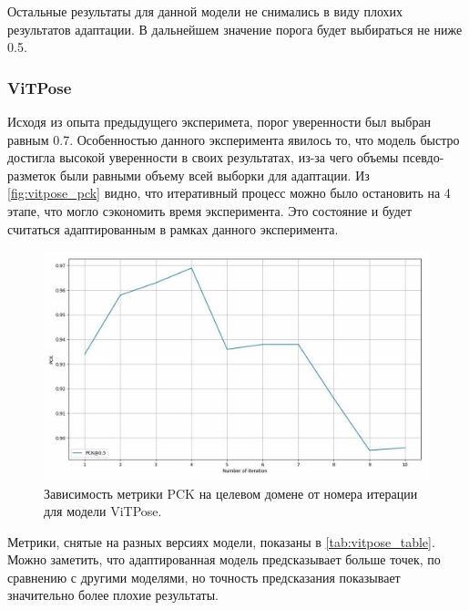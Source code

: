 Остальные результаты для данной модели не снимались в виду плохих результатов адаптации. В дальнейшем значение порога будет выбираться не ниже 0.5.

\subsubsection*{ViTPose}

Исходя из опыта предыдущего эксперимета, порог уверенности был выбран равным 0.7. Особенностью данного эксперимента явилось то, что модель быстро достигла высокой уверенности в своих результатах, из-за чего объемы псевдо-разметок были равными объему всей выборки для адаптации. Из \autoref{fig:vitpose_pck} видно, что итеративный процесс можно было остановить на 4 этапе, что могло сэкономить время эксперимента. Это состояние и будет считаться адаптированным в рамках данного эксперимента.

\begin{figure}[H]
	\centering
	\includegraphics[width=\textwidth]{./images/results/vitpose/vitpose_pck}
	\caption{Зависимость метрики PCK на целевом домене от номера итерации для модели ViTPose.}
	\label{fig:vitpose_pck}
\end{figure}

Метрики, снятые на разных версиях модели, показаны в \autoref{tab:vitpose_table}. Можно заметить, что адаптированная модель предсказывает больше точек, по сравнению с другими моделями, но точность предсказания показывает значительно более плохие результаты. 

